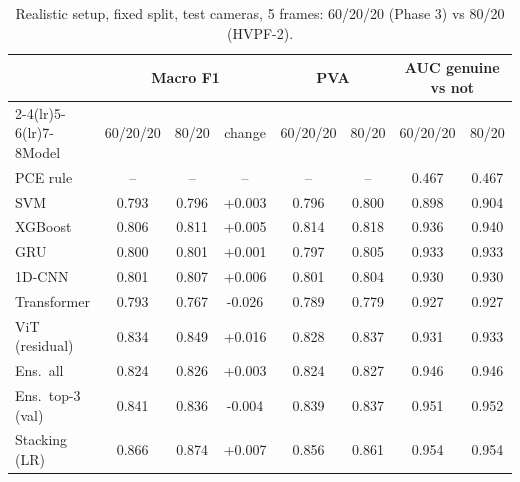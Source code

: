 \documentclass[11pt,a4paper]{article}
\begin{document}
\begin{table}[H]\centering\small\caption{Realistic setup, fixed split, test cameras, 5 frames: 60/20/20 (Phase 3) vs 80/20 (HVPF-2).}\begin{tabular}{lccccccc}\toprule & \multicolumn{3}{c}{Macro F1} & \multicolumn{2}{c}{PVA} & \multicolumn{2}{c}{AUC genuine vs not} \\\cmidrule(lr){2-4}\cmidrule(lr){5-6}\cmidrule(lr){7-8}Model & 60/20/20 & 80/20 & change & 60/20/20 & 80/20 & 60/20/20 & 80/20 \\\midrule
PCE rule & -- & -- & -- & -- & -- & 0.467 & 0.467 \\
SVM & 0.793 & 0.796 & +0.003 & 0.796 & 0.800 & 0.898 & 0.904 \\
XGBoost & 0.806 & 0.811 & +0.005 & 0.814 & 0.818 & 0.936 & 0.940 \\
GRU & 0.800 & 0.801 & +0.001 & 0.797 & 0.805 & 0.933 & 0.933 \\
1D-CNN & 0.801 & 0.807 & +0.006 & 0.801 & 0.804 & 0.930 & 0.930 \\
Transformer & 0.793 & 0.767 & -0.026 & 0.789 & 0.779 & 0.927 & 0.927 \\
ViT (residual) & 0.834 & 0.849 & +0.016 & 0.828 & 0.837 & 0.931 & 0.933 \\
Ens.\ all & 0.824 & 0.826 & +0.003 & 0.824 & 0.827 & 0.946 & 0.946 \\
Ens.\ top-3 (val) & 0.841 & 0.836 & -0.004 & 0.839 & 0.837 & 0.951 & 0.952 \\
Stacking (LR) & 0.866 & 0.874 & +0.007 & 0.856 & 0.861 & 0.954 & 0.954 \\
\bottomrule\end{tabular}\end{table}
\end{document}
